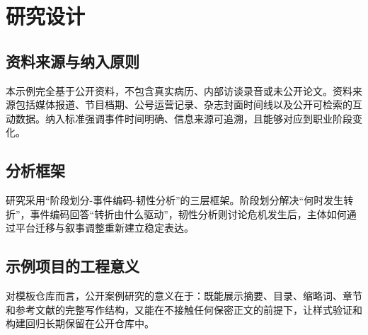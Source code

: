 \chapter{研究设计}

\section{资料来源与纳入原则}

本示例完全基于公开资料，不包含真实病历、内部访谈录音或未公开论文。资料来源包括媒体报道、节目档期、公号运营记录、杂志封面时间线以及公开可检索的互动数据。纳入标准强调事件时间明确、信息来源可追溯，且能够对应到职业阶段变化。

\section{分析框架}

研究采用“阶段划分-事件编码-韧性分析”的三层框架。阶段划分解决“何时发生转折”，事件编码回答“转折由什么驱动”，韧性分析则讨论危机发生后，主体如何通过平台迁移与叙事调整重新建立稳定表达。

\section{示例项目的工程意义}

对模板仓库而言，公开案例研究的意义在于：既能展示摘要、目录、缩略词、章节和参考文献的完整写作结构，又能在不接触任何保密正文的前提下，让样式验证和构建回归长期保留在公开仓库中。
